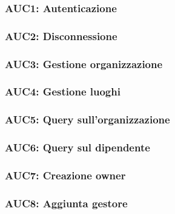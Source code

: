 \documentclass[../analisi-dei-requisiti.tex]{subfiles}
\begin{document}
\subsubsection{AUC1: Autenticazione}%
\label{subs:AUC1}



\subsubsection{AUC2: Disconnessione}%
\label{subs:AUC2}



\subsubsection{AUC3: Gestione organizzazione}%
\label{subs:AUC3}




\subsubsection{AUC4: Gestione luoghi}%
\label{subs:AUC4}





\subsubsection{AUC5: Query sull'organizzazione}%
\label{subs:AUC5}



\subsubsection{AUC6: Query sul dipendente}%
\label{subs:AUC6}



\subsubsection{AUC7: Creazione owner}%
\label{subs:AUC7}



\subsubsection{AUC8: Aggiunta gestore}%
\label{subs:AUC8}
\end{document}
